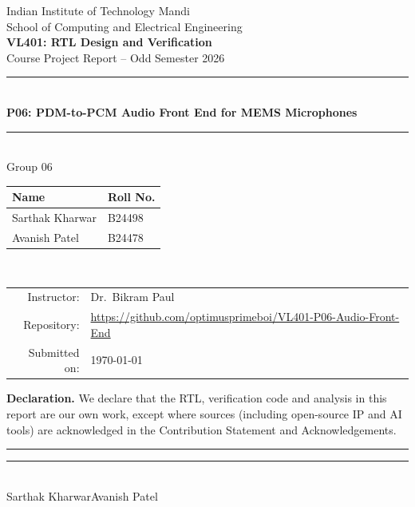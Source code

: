 \documentclass[11pt,a4paper]{article}
\newcommand{\groupno}{06}
\newcommand{\projno}{P06}
\newcommand{\projtitle}{PDM-to-PCM Audio Front End for MEMS Microphones}
\newcommand{\studentA}{Sarthak Kharwar}
\newcommand{\rollA}{B24498}
\newcommand{\studentB}{Avanish Patel}
\newcommand{\rollB}{B24478}
\newcommand{\repourl}{https://github.com/optimusprimeboi/VL401-P06-Audio-Front-End}
\newcommand{\submitdate}{\today}
\begin{document}
\begin{titlepage}
\centering
{\large Indian Institute of Technology Mandi}\\[2pt]
{\normalsize School of Computing and Electrical Engineering}\\[1.6cm]
{\Large\bfseries VL401: RTL Design and Verification}\\[4pt]
{\large Course Project Report -- Odd Semester 2026}\\[1.6cm]
{\color{iitblue}\rule{\linewidth}{1pt}}\\[8pt]
{\LARGE\bfseries \projno: \projtitle}\\[8pt]
{\color{iitblue}\rule{\linewidth}{1pt}}\\[1.4cm]
{\large Group \groupno}\\[10pt]
\begin{tabular}{ll}
\toprule
\textbf{Name} & \textbf{Roll No.}\\
\midrule
\studentA & \rollA\\
\studentB & \rollB\\
\bottomrule
\end{tabular}\\[1.2cm]
\begin{tabular}{rl}
Instructor: & Dr.\ Bikram Paul\\
Repository: & \url{\repourl}\\
Submitted on: & \submitdate\\
\end{tabular}
\vfill
\begin{minipage}{0.92\linewidth}\small
\textbf{Declaration.} We declare that the RTL, verification code and analysis in this report are our own
work, except where sources (including open-source IP and AI tools) are acknowledged in
the Contribution Statement and Acknowledgements.\\[1.0cm]
\rule{5.5cm}{0.4pt}\hfill\rule{5.5cm}{0.4pt}\\
\studentA\hfill\studentB
\end{minipage}
\end{titlepage}
\end{document}
